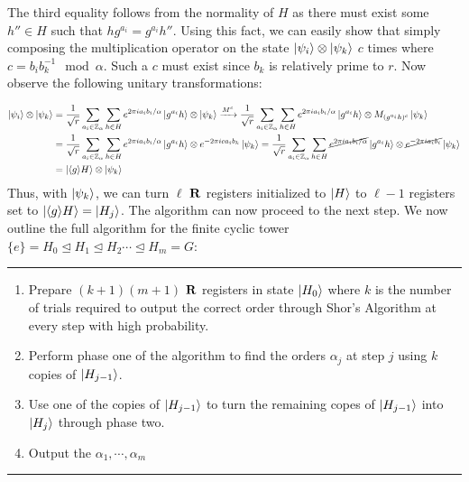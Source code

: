 %
The third equality follows from the normality of $H$ as there must exist some $h'' \in H$ such that $hg^{a_i} = g^{a_i}h''$.
%
Using this fact, we can easily show that simply composing the multiplication operator on the state $\ket{\psi_i} \otimes \ket{\psi_k}$ $c$ times where $c = b_ib_k^{-1} \mod \alpha$. Such a $c$ must exist since $b_k$ is relatively prime to $r$. Now observe the following unitary transformations:

\begin{align*}
\ket{\psi_i} \otimes \ket{\psi_k}
& = \frac{1}{\sqrt{r}}\sum_{a_i \in \mathbb{Z}_\alpha} \sum_{h \in H} e^{2 \pi i a_i b_i / \alpha} \ket{g^{a_i}h} \otimes \ket{\psi_k} \xrightarrow{M^c}  \frac{1}{\sqrt{r}}\sum_{a_i \in \mathbb{Z}_\alpha} \sum_{h \in H} e^{2 \pi i a_i b_i / \alpha} \ket{g^{a_i}h} \otimes M_{(g^{a_i}h)^c}\ket{\psi_k} \\
& = \frac{1}{\sqrt{r}}\sum_{a_i \in \mathbb{Z}_\alpha} \sum_{h \in H} e^{2 \pi i a_i b_i / \alpha} \ket{g^{a_i}h} \otimes e^{-2\pi i ca_ib_k}\ket{\psi_k} = \frac{1}{\sqrt{r}}\sum_{a_i \in \mathbb{Z}_\alpha} \sum_{h \in H} \cancel{e^{2 \pi i a_i b_i / \alpha}} \ket{g^{a_i}h} \otimes \cancel{e^{-2\pi ia_ib_i}}\ket{\psi_k} \\
& = \ket{\langle g \rangle H} \otimes \ket{\psi_{k}}
\end{align*}
%
Thus, with $\ket{\psi_k}$, we can turn $\ell$ ${\bf R}$ registers initialized to $\ket{H}$ to $\ell -1$ registers set to $\ket{\langle g \rangle H} = \ket{H_j}$. The algorithm can now proceed to the next step.
%
We now outline the full algorithm for the finite cyclic tower $\{e\} = H_0 \trianglelefteq H_1 \trianglelefteq H_2 \cdots \trianglelefteq H_m = G$: \newline

\hrule
\begin{enumerate}
  \item Prepare $(k+1)(m+1)$ ${\bf R}$ registers in state $\ket{H_0}$ where $k$ is the number of trials required to output the correct order through Shor's Algorithm at every step with high probability.
  \item Perform phase one of the algorithm to find the orders $\alpha_j$ at step $j$ using $k$ copies of $\ket{H_{j-1}}$.
  \item Use one of the copies of $\ket{H_{j-1}}$ to turn the remaining copes of $\ket{H_{j-1}}$ into $\ket{H_{j}}$ through phase two.
  \item Output the $\alpha_1, \cdots, \alpha_m$
\end{enumerate}
\hrule

